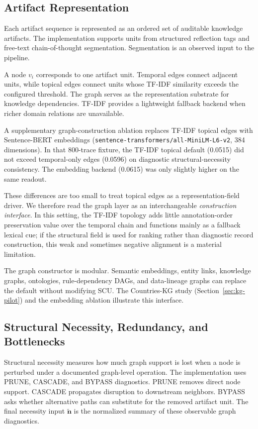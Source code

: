 \documentclass[a4paper,fleqn]{cas-sc}
\begin{document}
\subsection{Artifact Representation}

Each artifact sequence is represented as an ordered set of auditable knowledge artifacts. The implementation supports units from structured reflection tags and free-text chain-of-thought segmentation. Segmentation is an observed input to the pipeline.

A node $v_i$ corresponds to one artifact unit. Temporal edges connect adjacent units, while topical edges connect units whose TF-IDF similarity exceeds the configured threshold. The graph serves as the representation substrate for knowledge dependencies. TF-IDF provides a lightweight fallback backend when richer domain relations are unavailable.

A supplementary graph-construction ablation replaces TF-IDF topical edges with Sentence-BERT embeddings (\texttt{sentence-transformers/all-MiniLM-L6-v2}, 384 dimensions). In that 800-trace fixture, the TF-IDF topical default (0.0515) did not exceed temporal-only edges (0.0596) on diagnostic structural-necessity consistency. The embedding backend (0.0615) was only slightly higher on the same readout.

These differences are too small to treat topical edges as a representation-field driver. We therefore read the graph layer as an interchangeable \emph{construction interface}. In this setting, the TF-IDF topology adds little annotation-order preservation value over the temporal chain and functions mainly as a fallback lexical cue; if the structural field is used for ranking rather than diagnostic record construction, this weak and sometimes negative alignment is a material limitation.

The graph constructor is modular. Semantic embeddings, entity links, knowledge graphs, ontologies, rule-dependency DAGs, and data-lineage graphs can replace the default without modifying SCU. The Countries-KG study (Section~\ref{sec:kg-pilot}) and the embedding ablation illustrate this interface.

\subsection{Structural Necessity, Redundancy, and Bottlenecks}

Structural necessity measures how much graph support is lost when a node is perturbed under a documented graph-level operation. The implementation uses PRUNE, CASCADE, and BYPASS diagnostics. PRUNE removes direct node support. CASCADE propagates disruption to downstream neighbors. BYPASS asks whether alternative paths can substitute for the removed artifact unit. The final necessity input $\tilde{\mathbf{n}}$ is the normalized summary of these observable graph diagnostics.
\end{document}
